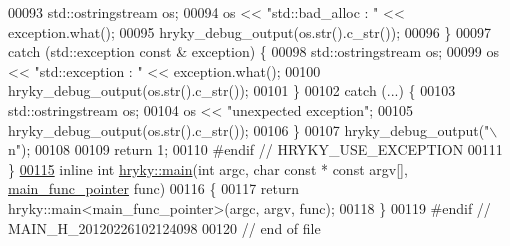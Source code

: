 \begin{DoxyCode}
00093         std::ostringstream os;
00094         os << \textcolor{stringliteral}{"std::bad\_alloc : "} << exception.what();
00095         hryky\_debug\_output(os.str().c\_str());
00096     \}
00097     \textcolor{keywordflow}{catch} (std::exception \textcolor{keyword}{const} & exception) \{
00098         std::ostringstream os;
00099         os << \textcolor{stringliteral}{"std::exception : "} << exception.what();
00100         hryky\_debug\_output(os.str().c\_str());
00101     \}
00102     \textcolor{keywordflow}{catch} (...) \{
00103         std::ostringstream os;
00104         os << \textcolor{stringliteral}{"unexpected exception"};
00105         hryky\_debug\_output(os.str().c\_str());
00106     \}
00107     hryky\_debug\_output(\textcolor{stringliteral}{"\(\backslash\)n"});
00108     
00109     \textcolor{keywordflow}{return} 1;
00110 \textcolor{preprocessor}{#endif // HRYKY\_USE\_EXCEPTION}
00111 \textcolor{preprocessor}{}\}
\hypertarget{main_8h_source_l00115}{}\hyperlink{namespacehryky_a67f55b393c526ea5965bc45873f9fd88}{00115} \textcolor{keyword}{inline} \textcolor{keywordtype}{int} \hyperlink{namespacehryky_acf43d20e6c0b5e4b54931d42b46443a1}{hryky::main}(\textcolor{keywordtype}{int} argc, \textcolor{keywordtype}{char} \textcolor{keyword}{const} * \textcolor{keyword}{const} argv[], \hyperlink{namespacehryky_a9135850015ed231a278a8871bef3d80e}{main_func_pointer} 
      func)
00116 \{
00117     \textcolor{keywordflow}{return} hryky::main<main\_func\_pointer>(argc, argv, func);
00118 \}
00119 \textcolor{preprocessor}{#endif // MAIN\_H\_20120226102124098}
00120 \textcolor{preprocessor}{}\textcolor{comment}{// end of file}
\end{DoxyCode}
